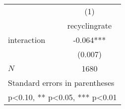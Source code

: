 {
\def\sym#1{\ifmmode^{#1}\else\(^{#1}\)\fi}
\begin{tabular}{l*{1}{c}}
\hline\hline
            &\multicolumn{1}{c}{(1)}\\
            &\multicolumn{1}{c}{recyclingrate}\\
\hline
interaction &      -0.064***\\
            &     (0.007)   \\
\hline
\(N\)       &        1680   \\
\hline\hline
\multicolumn{2}{l}{\footnotesize Standard errors in parentheses}\\
\multicolumn{2}{l}{\footnotesize * p<0.10, ** p<0.05, *** p<0.01}\\
\end{tabular}
}
